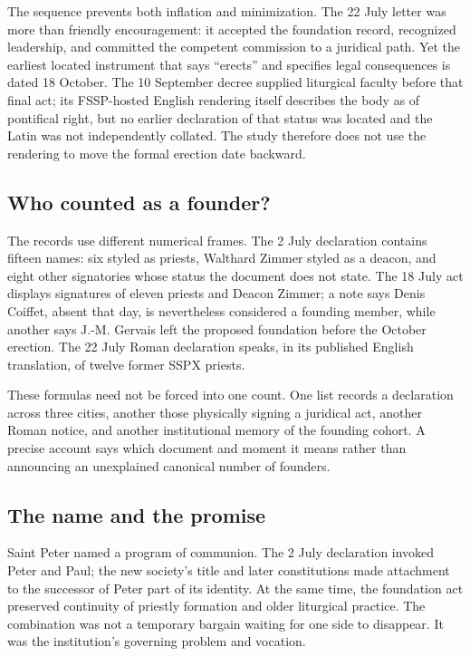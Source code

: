 The sequence prevents both inflation and minimization. The 22 July letter was more than friendly encouragement: it accepted the foundation record, recognized leadership, and committed the competent commission to a juridical path. Yet the earliest located instrument that says ``erects'' and specifies legal consequences is dated 18 October. The 10 September decree supplied liturgical faculty before that final act; its FSSP-hosted English rendering itself describes the body as of pontifical right, but no earlier declaration of that status was located and the Latin was not independently collated. The study therefore does not use the rendering to move the formal erection date backward.

\subsection{Who counted as a founder?}

The records use different numerical frames. The 2 July declaration contains fifteen names: six styled as priests, Walthard Zimmer styled as a deacon, and eight other signatories whose status the document does not state. The 18 July act displays signatures of eleven priests and Deacon Zimmer; a note says Denis Coiffet, absent that day, is nevertheless considered a founding member, while another says J.-M. Gervais left the proposed foundation before the October erection. The 22 July Roman declaration speaks, in its published English translation, of twelve former SSPX priests.

These formulas need not be forced into one count. One list records a declaration across three cities, another those physically signing a juridical act, another Roman notice, and another institutional memory of the founding cohort. A precise account says which document and moment it means rather than announcing an unexplained canonical number of founders.

\subsection{The name and the promise}

Saint Peter named a program of communion. The 2 July declaration invoked Peter and Paul; the new society's title and later constitutions made attachment to the successor of Peter part of its identity. At the same time, the foundation act preserved continuity of priestly formation and older liturgical practice. The combination was not a temporary bargain waiting for one side to disappear. It was the institution's governing problem and vocation.

